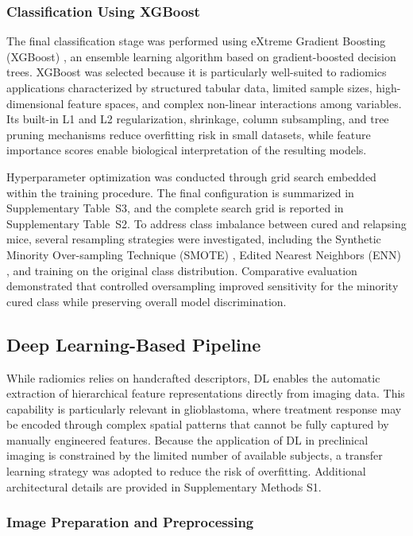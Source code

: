 \documentclass{article}
\begin{document}
\subsubsection{Classification Using XGBoost}

The final classification stage was performed using eXtreme Gradient Boosting (XGBoost) \cite{Chen2016}, an ensemble learning algorithm based on gradient-boosted decision trees. XGBoost was selected because it is particularly well-suited to radiomics applications characterized by structured tabular data, limited sample sizes, high-dimensional feature spaces, and complex non-linear interactions among variables. Its built-in L1 and L2 regularization, shrinkage, column subsampling, and tree pruning mechanisms reduce overfitting risk in small datasets, while feature importance scores enable biological interpretation of the resulting models.

Hyperparameter optimization was conducted through grid search embedded within the training procedure. The final configuration is summarized in Supplementary Table~S3, and the complete search grid is reported in Supplementary Table~S2. To address class imbalance between cured and relapsing mice, several resampling strategies were investigated, including the Synthetic Minority Over-sampling Technique (SMOTE) \cite{Chawla2002}, Edited Nearest Neighbors (ENN) \cite{Wilson1972}, and training on the original class distribution. Comparative evaluation demonstrated that controlled oversampling improved sensitivity for the minority cured class while preserving overall model discrimination.


\subsection{Deep Learning-Based Pipeline}

While radiomics relies on handcrafted descriptors, DL enables the automatic extraction of hierarchical feature representations directly from imaging data. This capability is particularly relevant in glioblastoma, where treatment response may be encoded through complex spatial patterns that cannot be fully captured by manually engineered features. Because the application of DL in preclinical imaging is constrained by the limited number of available subjects, a transfer learning strategy was adopted to reduce the risk of overfitting. Additional architectural details are provided in Supplementary Methods S1.

\subsubsection{Image Preparation and Preprocessing}
\end{document}
